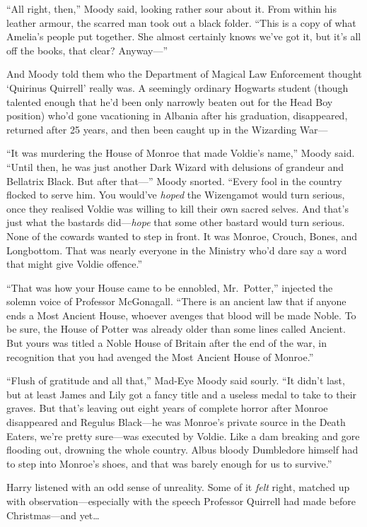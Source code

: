 ``All right, then,'' Moody said, looking rather sour about it. From
within his leather armour, the scarred man took out a black folder.
``This is a copy of what Amelia's people put together. She almost
certainly knows we've got it, but it's all off the books, that clear?
Anyway---''

And Moody told them who the Department of Magical Law Enforcement
thought `Quirinus Quirrell' really was. A seemingly ordinary Hogwarts
student (though talented enough that he'd been only narrowly beaten out
for the Head Boy position) who'd gone vacationing in Albania after his
graduation, disappeared, returned after 25 years, and then been caught
up in the Wizarding War---

``It was murdering the House of Monroe that made Voldie's name,'' Moody
said. ``Until then, he was just another Dark Wizard with delusions of
grandeur and Bellatrix Black. But after that---'' Moody snorted. ``Every
fool in the country flocked to serve him. You would've \emph{hoped} the
Wizengamot would turn serious, once they realised Voldie was willing to
kill their own sacred selves. And that's just what the bastards
did---\emph{hope} that some other bastard would turn serious. None of
the cowards wanted to step in front. It was Monroe, Crouch, Bones, and
Longbottom. That was nearly everyone in the Ministry who'd dare say a
word that might give Voldie offence.''

``That was how your House came to be ennobled, Mr.~Potter,'' injected
the solemn voice of Professor McGonagall. ``There is an ancient law that
if anyone ends a Most Ancient House, whoever avenges that blood will be
made Noble. To be sure, the House of Potter was already older than some
lines called Ancient. But yours was titled a Noble House of Britain
after the end of the war, in recognition that you had avenged the Most
Ancient House of Monroe.''

``Flush of gratitude and all that,'' Mad-Eye Moody said sourly. ``It
didn't last, but at least James and Lily got a fancy title and a useless
medal to take to their graves. But that's leaving out eight years of
complete horror after Monroe disappeared and Regulus Black---he was
Monroe's private source in the Death Eaters, we're pretty sure---was
executed by Voldie. Like a dam breaking and gore flooding out, drowning
the whole country. Albus bloody Dumbledore himself had to step into
Monroe's shoes, and that was barely enough for us to survive.''

Harry listened with an odd sense of unreality. Some of it \emph{felt}
right, matched up with observation---especially with the speech
Professor Quirrell had made before Christmas---and yet\ldots{}

